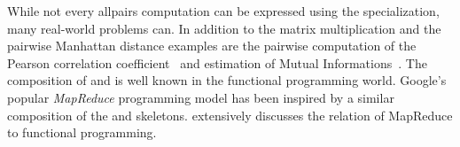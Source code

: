 While not every allpairs computation can be expressed using the specialization, many real-world problems can.
In addition to the matrix multiplication and the pairwise Manhattan distance examples are the pairwise computation of the Pearson correlation coefficient~\cite{ChangDeQuRo2009} and estimation of Mutual Informations~\cite{DaubStSeKl2004}.
The composition of \zip and \reduce is well known in the functional programming world.
Google's popular \emph{MapReduce} programming model has been inspired by a similar composition of the \map and \reduce skeletons.
\cite{Laemmel2007} extensively discusses the relation of MapReduce to functional programming.


% 
